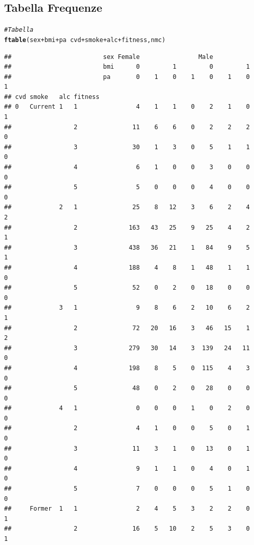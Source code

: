 \documentclass{article}\usepackage[]{graphicx}\usepackage[]{xcolor}
\makeatletter
\newcommand{\hlcom}[1]{\textcolor[rgb]{0.678,0.584,0.686}{\textit{#1}}}%
\newcommand{\hlopt}[1]{\textcolor[rgb]{0,0,0}{#1}}%
\newcommand{\hlstd}[1]{\textcolor[rgb]{0.345,0.345,0.345}{#1}}%
\newcommand{\hlkwd}[1]{\textcolor[rgb]{0.737,0.353,0.396}{\textbf{#1}}}%
\newenvironment{kframe}{%
 \def\at@end@of@kframe{}%
 \ifinner\ifhmode%
  \def\at@end@of@kframe{\end{minipage}}%
  \begin{minipage}{\columnwidth}%
 \fi\fi%
 \def\FrameCommand##1{\hskip\@totalleftmargin \hskip-\fboxsep
 \colorbox{shadecolor}{##1}\hskip-\fboxsep
     \hskip-\linewidth \hskip-\@totalleftmargin \hskip\columnwidth}%
 \MakeFramed {\advance\hsize-\width
   \@totalleftmargin\z@ \linewidth\hsize
   \@setminipage}}%
 {\par\unskip\endMakeFramed%
 \at@end@of@kframe}
\newenvironment{knitrout}{}{} %
\makeatother
\begin{document}
  \subsection{Tabella Frequenze}
\begin{knitrout}
\color{fgcolor}\begin{kframe}
\begin{alltt}
\hlcom{#Tabella}
\hlkwd{ftable}\hlstd{(sex}\hlopt{+}\hlstd{bmi}\hlopt{+}\hlstd{pa} \hlopt{~} \hlstd{cvd}\hlopt{+}\hlstd{smoke}\hlopt{+}\hlstd{alc}\hlopt{+}\hlstd{fitness, nmc)}
\end{alltt}
\begin{verbatim}
##                         sex Female                Male               
##                         bmi      0         1         0         1     
##                         pa       0    1    0    1    0    1    0    1
## cvd smoke   alc fitness                                              
## 0   Current 1   1                4    1    1    0    2    1    0    1
##                 2               11    6    6    0    2    2    2    0
##                 3               30    1    3    0    5    1    1    0
##                 4                6    1    0    0    3    0    0    0
##                 5                5    0    0    0    4    0    0    0
##             2   1               25    8   12    3    6    2    4    2
##                 2              163   43   25    9   25    4    2    1
##                 3              438   36   21    1   84    9    5    1
##                 4              188    4    8    1   48    1    1    0
##                 5               52    0    2    0   18    0    0    0
##             3   1                9    8    6    2   10    6    2    1
##                 2               72   20   16    3   46   15    1    2
##                 3              279   30   14    3  139   24   11    0
##                 4              198    8    5    0  115    4    3    0
##                 5               48    0    2    0   28    0    0    0
##             4   1                0    0    0    1    0    2    0    0
##                 2                4    1    0    0    5    0    1    0
##                 3               11    3    1    0   13    0    1    0
##                 4                9    1    1    0    4    0    1    0
##                 5                7    0    0    0    5    1    0    0
##     Former  1   1                2    4    5    3    2    2    0    1
##                 2               16    5   10    2    5    3    0    1

\end{verbatim}
\end{kframe}
\end{knitrout}
\end{document}
